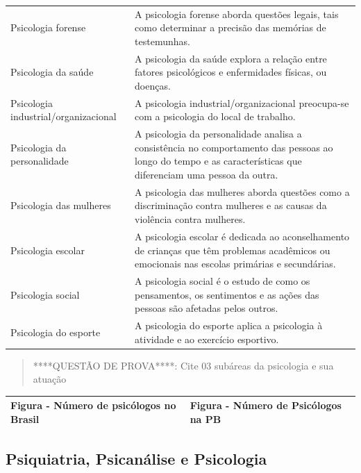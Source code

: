 \documentclass[
]{book}
\begin{document}
\begin{longtable}[]{@{}
  >{\raggedright\arraybackslash}p{}
  >{\raggedright\arraybackslash}p{}@{}}
Psicologia forense & A psicologia forense aborda questões legais, tais como determinar a precisão das memórias de testemunhas. \\
Psicologia da saúde & A psicologia da saúde explora a relação entre fatores psicológicos e enfermidades físicas, ou doenças. \\
Psicologia industrial/organizacional & A psicologia industrial/organizacional preocupa-se com a psicologia do local de trabalho. \\
Psicologia da personalidade & A psicologia da personalidade analisa a consistência no comportamento das pessoas ao longo do tempo e as características que diferenciam uma pessoa da outra. \\
Psicologia das mulheres & A psicologia das mulheres aborda questões como a discriminação contra mulheres e as causas da violência contra mulheres. \\
Psicologia escolar & A psicologia escolar é dedicada ao aconselhamento de crianças que têm problemas acadêmicos ou emocionais nas escolas primárias e secundárias. \\
Psicologia social & A psicologia social é o estudo de como os pensamentos, os sentimentos e as ações das pessoas são afetadas pelos outros. \\
Psicologia do esporte & A psicologia do esporte aplica a psicologia à atividade e ao exercício esportivo. \\
\bottomrule()
\end{longtable}

\begin{quote}
****QUESTÃO DE PROVA****: Cite 03 subáreas da psicologia e sua atuação
\end{quote}

\begin{longtable}[]{@{}
  >{\centering\arraybackslash}p{}
  >{\centering\arraybackslash}p{}@{}}
\toprule()
\endhead
Figura - Número de psicólogos no Brasil & Figura - Número de Psicólogos na PB \\
\bottomrule()
\end{longtable}

\hypertarget{psiquiatria-psicanuxe1lise-e-psicologia}{%
\subsection{Psiquiatria, Psicanálise e Psicologia}\label{psiquiatria-psicanuxe1lise-e-psicologia}}
\end{document}

